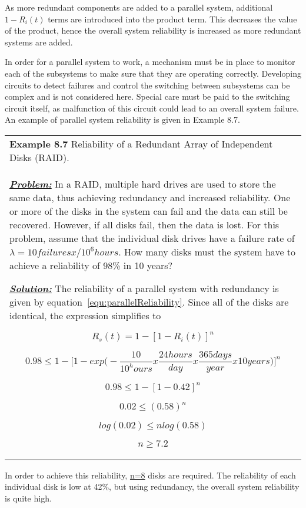 {As more redundant components are added to a parallel system, additional
$1-R_i(t)$ terms are introduced into the
product term. This decreases the value of the product, hence the overall
system reliability is increased as more redundant systems are added.

In order for a parallel system to work, a mechanism must be in place to
monitor each of the subsystems to make sure that they are operating
correctly. Developing circuits to detect failures and control the
switching between subsystems can be complex and is not considered here.
Special care must be paid to the switching circuit itself, as
malfunction of this circuit could lead to an overall system failure. An
example of parallel system reliability is given in Example 8.7.


\begin{table}
\begin{tabular}{m{15cm}|}
\textbf{Example 8.7} 
Reliability of a Redundant Array of Independent Disks (RAID).\\

\emph{\textbf{\ul{Problem:}}} In a RAID, multiple hard drives are used
to store the same data, thus achieving redundancy and increased
reliability. One or more of the disks in the system can fail and the
data can still be recovered. However, if all disks fail, then the data
is lost. For this problem, assume that the individual disk drives have a
failure rate of $\lambda = 10 failuresx/10^6 hours$. How many disks
must the system have to achieve a reliability of 98\% in 10 years?

\emph{\textbf{\ul{Solution:}}} The reliability of a parallel system with
redundancy is given by equation~\ref{equ:parallelReliability}. 
Since all of the disks are identical, the expression simplifies to

$$R_s(t) = 1 - \left[ 1 - R_i(t) \right]^n$$

$$0.98 \leq 1 - \big[ 1 - exp\big( - \frac {10}{10^ hours} x \frac{24 hours}{day} x \frac{365 days}{year} x 10 years \big) \big]^n$$

$$0.98 \leq 1 - \left[1-0.42\right]^n$$

$$0.02 \leq (0.58)^n$$

$$log(0.02) \leq nlog(0.58)$$

$$n \geq 7.2$$
\end{tabular}
\end{table}

In order to achieve this reliability, \ul{n=8} disks are required. The
reliability of each individual disk is low at 42\%, but using
redundancy, the overall system reliability is quite high.

}
